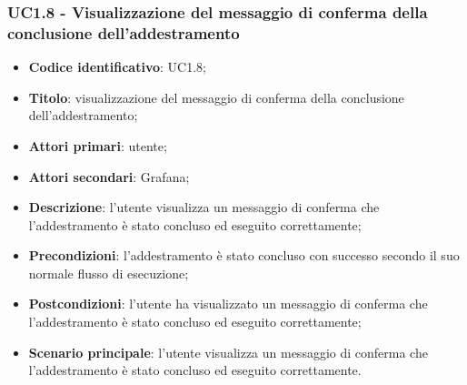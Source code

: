 \subsubsection{UC1.8 - Visualizzazione del messaggio di conferma della conclusione dell'addestramento}
\begin{itemize}
	\item \textbf{Codice identificativo}: UC1.8;
	\item \textbf{Titolo}: visualizzazione del messaggio di conferma della conclusione dell'addestramento;
	\item \textbf{Attori primari}: utente;
	\item \textbf{Attori secondari}: Grafana\glo;
	\item \textbf{Descrizione}: l'utente visualizza un messaggio di conferma che l'addestramento è stato concluso ed eseguito correttamente;
	\item \textbf{Precondizioni}: l'addestramento è stato concluso con successo secondo il suo normale flusso di esecuzione;
	\item \textbf{Postcondizioni}: l'utente ha visualizzato un messaggio di conferma che l'addestramento è stato concluso ed eseguito correttamente;
	\item \textbf{Scenario principale}: l'utente visualizza un messaggio di conferma che l'addestramento è stato concluso ed eseguito correttamente.
\end{itemize}
